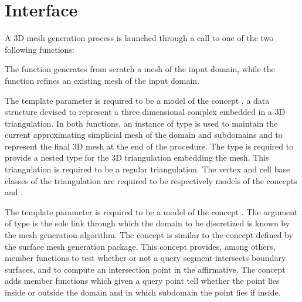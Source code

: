 \section{Interface}
\label{Mesh_3_section_interface}

A 3D mesh generation  process is launched through a call
 to   one of the two following functions:
 
             



The function  generates from scratch a mesh
of the input domain, while
the function  refines
an existing mesh of the input domain.

The template parameter  is required to be a model of
the concept 
, a data structure devised to
represent a three dimensional complex embedded in a 3D
triangulation. In both functions,  an instance  of type  is used to maintain the current
approximating simplicial mesh of the domain and subdomains
and to represent the final  3D mesh at the end
of the procedure.
The type  is   required to provide a nested type
 for the 3D triangulation
embedding the mesh. This triangulation is required to be a regular
triangulation.
 The vertex and cell base classes of the
triangulation  are required to be respectively  models of the
concepts  and .

The template parameter  is required to be a model of
the concept  . The argument  of type
 is the sole link through which the domain
to be discretized is known  by the mesh generation algorithm. 
The concept  is similar to the concept  
defined by the surface mesh generation package.
This concept  provides, among others,
  member functions to test whether or not
a query segment intersects boundary surfaces,
and to compute an intersection point  in the affirmative.
The  concept adds  member functions 
which given a query point tell whether the point lies
inside or outside the domain and in which subdomain the point lies
if inside.

